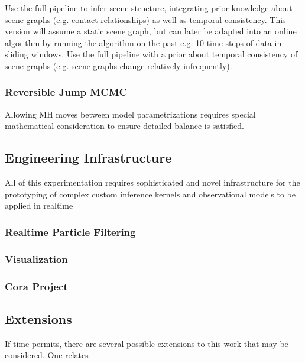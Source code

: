     Use the full pipeline to infer scene structure, integrating prior knowledge
    about scene graphs (e.g. contact relationships) as well as temporal
    consistency. This version will assume a static scene graph, but can later
    be adapted into an online algorithm by running the algorithm on the past
    e.g. 10 time steps of data in sliding windows.
    Use the full pipeline with a prior about temporal consistency of scene
    graphs (e.g. scene graphs change relatively infrequently).

    \subsubsection{Reversible Jump MCMC}

      Allowing MH moves between model parametrizations requires special
      mathematical consideration to ensure detailed balance is satisfied.


  \subsection{Engineering Infrastructure}

    All of this experimentation requires sophisticated and novel infrastructure 
    for the prototyping of complex custom inference kernels and observational models
    to be applied in realtime 

    \subsubsection{Realtime Particle Filtering}


    \subsubsection{Visualization}

    \todo

    \subsubsection{Cora Project}

    \todo


  \subsection{Extensions}

    If time permits, there are several possible extensions to this work that
    may be considered. One relates \todo
